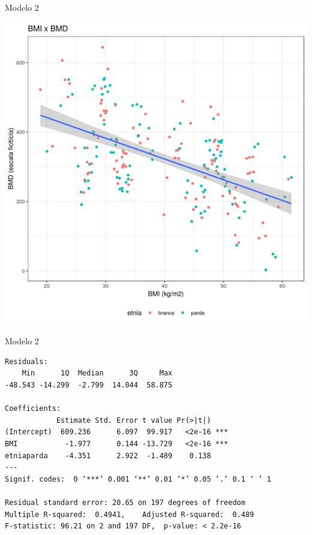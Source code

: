 \documentclass{beamer}
\begin{document}
\begin{frame}{\small Modelo 2}
  \begin{center}
    \includegraphics[height=.9\textheight]{Cap31-32/pratica-rlm2_0}
  \end{center}
\end{frame}

\begin{frame}[fragile]{}
  \begin{center}
    \begin{exampleblock}{Modelo 2}
      \tiny
\begin{verbatim}
Residuals:
    Min      1Q  Median      3Q     Max 
-48.543 -14.299  -2.799  14.044  58.875 

Coefficients:
            Estimate Std. Error t value Pr(>|t|)    
(Intercept)  609.236      6.097  99.917   <2e-16 ***
BMI           -1.977      0.144 -13.729   <2e-16 ***
etniaparda    -4.351      2.922  -1.489    0.138    
---
Signif. codes:  0 ‘***’ 0.001 ‘**’ 0.01 ‘*’ 0.05 ‘.’ 0.1 ‘ ’ 1

Residual standard error: 20.65 on 197 degrees of freedom
Multiple R-squared:  0.4941,	Adjusted R-squared:  0.489 
F-statistic: 96.21 on 2 and 197 DF,  p-value: < 2.2e-16
\end{verbatim}
    \end{exampleblock}
  \end{center}
\end{frame}
\end{document}
